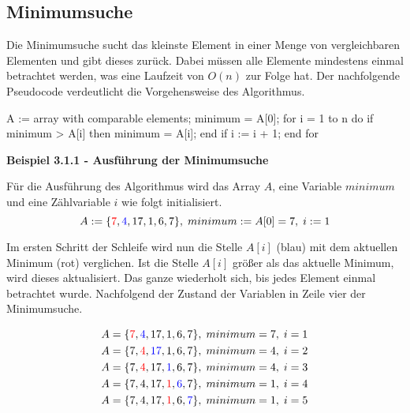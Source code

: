 \subsection{Minimumsuche}

Die Minimumsuche sucht das kleinste Element in einer Menge von vergleichbaren Elementen und gibt dieses zurück. Dabei müssen alle Elemente mindestens einmal betrachtet werden, was eine Laufzeit von $O(n)$ zur Folge hat. Der nachfolgende Pseudocode verdeutlicht die Vorgehensweise des Algorithmus.

\begin{PseudoCode}
A := array with comparable elements;
minimum = A[0];
for i = 1 to n do
	if minimum > A[i] then
		minimum = A[i];
	end if
	i := i + 1;
end for
\end{PseudoCode}

\noindent
\textbf{Beispiel 3.1.1 - Ausführung der Minimumsuche}

\noindent
Für die Ausführung des Algorithmus wird das Array $A$, eine Variable $minimum$ und eine Zählvariable $i$ wie folgt initialisiert. 
\begin{equation*}
	A := \{\textcolor{red}{7}, \textcolor{blue}{4}, 17, 1, 6, 7\},\;minimum := A[0] = 7,\;i := 1
\end{equation*}

\noindent
Im ersten Schritt der Schleife wird nun die Stelle $A[i]$ (blau) mit dem aktuellen Minimum (rot) verglichen. Ist die Stelle $A[i]$ größer als das aktuelle Minimum, wird dieses aktualisiert. Das ganze wiederholt sich, bis jedes Element einmal betrachtet wurde. Nachfolgend der Zustand der Variablen in Zeile vier der Minimumsuche.

\begin{equation*}
	\begin{split}
		A = \{\textcolor{red}{7}, \textcolor{blue}{4}, 17, 1, 6, 7\},\;minimum = 7,\;i = 1 \\
		A = \{7, \textcolor{red}{4}, \textcolor{blue}{17}, 1, 6, 7\},\;minimum = 4,\;i = 2 \\
		A = \{7, \textcolor{red}{4}, 17, \textcolor{blue}{1}, 6, 7\},\;minimum = 4,\;i = 3 \\
		A = \{7, 4, 17, \textcolor{red}{1}, \textcolor{blue}{6}, 7\},\;minimum = 1,\;i = 4 \\
		A = \{7, 4, 17, \textcolor{red}{1}, 6, \textcolor{blue}{7}\},\;minimum = 1,\;i = 5 
	\end{split}
\end{equation*}


\newpage




